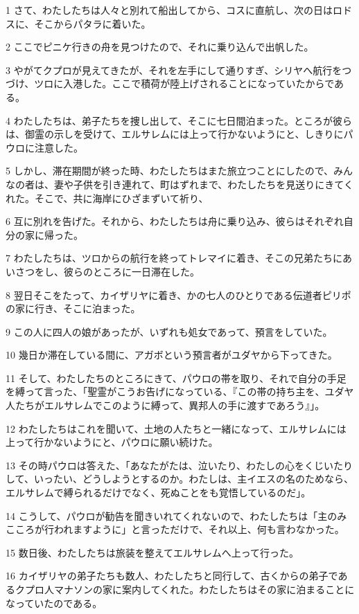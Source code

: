 \par 1 さて、わたしたちは人々と別れて船出してから、コスに直航し、次の日はロドスに、そこからパタラに着いた。
\par 2 ここでピニケ行きの舟を見つけたので、それに乗り込んで出帆した。
\par 3 やがてクプロが見えてきたが、それを左手にして通りすぎ、シリヤへ航行をつづけ、ツロに入港した。ここで積荷が陸上げされることになっていたからである。
\par 4 わたしたちは、弟子たちを捜し出して、そこに七日間泊まった。ところが彼らは、御霊の示しを受けて、エルサレムには上って行かないようにと、しきりにパウロに注意した。
\par 5 しかし、滞在期間が終った時、わたしたちはまた旅立つことにしたので、みんなの者は、妻や子供を引き連れて、町はずれまで、わたしたちを見送りにきてくれた。そこで、共に海岸にひざまずいて祈り、
\par 6 互に別れを告げた。それから、わたしたちは舟に乗り込み、彼らはそれぞれ自分の家に帰った。
\par 7 わたしたちは、ツロからの航行を終ってトレマイに着き、そこの兄弟たちにあいさつをし、彼らのところに一日滞在した。
\par 8 翌日そこをたって、カイザリヤに着き、かの七人のひとりである伝道者ピリポの家に行き、そこに泊まった。
\par 9 この人に四人の娘があったが、いずれも処女であって、預言をしていた。
\par 10 幾日か滞在している間に、アガボという預言者がユダヤから下ってきた。
\par 11 そして、わたしたちのところにきて、パウロの帯を取り、それで自分の手足を縛って言った、「聖霊がこうお告げになっている、『この帯の持ち主を、ユダヤ人たちがエルサレムでこのように縛って、異邦人の手に渡すであろう』」。
\par 12 わたしたちはこれを聞いて、土地の人たちと一緒になって、エルサレムには上って行かないようにと、パウロに願い続けた。
\par 13 その時パウロは答えた、「あなたがたは、泣いたり、わたしの心をくじいたりして、いったい、どうしようとするのか。わたしは、主イエスの名のためなら、エルサレムで縛られるだけでなく、死ぬことをも覚悟しているのだ」。
\par 14 こうして、パウロが勧告を聞きいれてくれないので、わたしたちは「主のみこころが行われますように」と言っただけで、それ以上、何も言わなかった。
\par 15 数日後、わたしたちは旅装を整えてエルサレムへ上って行った。
\par 16 カイザリヤの弟子たちも数人、わたしたちと同行して、古くからの弟子であるクプロ人マナソンの家に案内してくれた。わたしたちはその家に泊まることになっていたのである。
